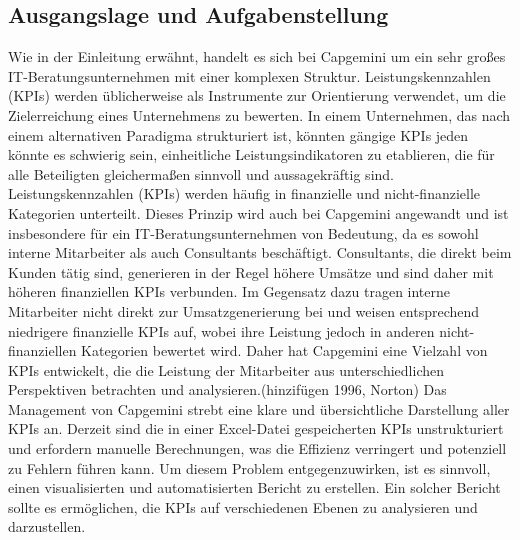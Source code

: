 \documentclass[a4paper, 12pt]{scrartcl}
\begin{document}
	\subsection{Ausgangslage und Aufgabenstellung}
Wie in der Einleitung erwähnt, handelt es sich bei Capgemini um ein sehr großes IT-Beratungsunternehmen mit einer komplexen Struktur. Leistungskennzahlen (KPIs) werden üblicherweise als Instrumente zur Orientierung verwendet, um die Zielerreichung eines Unternehmens zu bewerten. In einem Unternehmen, das nach einem alternativen Paradigma strukturiert ist, könnten gängige KPIs jeden könnte es schwierig sein, einheitliche Leistungsindikatoren zu etablieren, die für alle Beteiligten gleichermaßen sinnvoll und aussagekräftig sind\cite{aro2023using}.
\newline
Leistungskennzahlen (KPIs) werden häufig in finanzielle und nicht-finanzielle Kategorien unterteilt. Dieses Prinzip wird auch bei Capgemini angewandt und ist insbesondere für ein IT-Beratungsunternehmen von Bedeutung, da es sowohl interne Mitarbeiter als auch Consultants beschäftigt. Consultants, die direkt beim Kunden tätig sind, generieren in der Regel höhere Umsätze und sind daher mit höheren finanziellen KPIs verbunden. Im Gegensatz dazu tragen interne Mitarbeiter nicht direkt zur Umsatzgenerierung bei und weisen entsprechend niedrigere finanzielle KPIs auf, wobei ihre Leistung jedoch in anderen nicht-finanziellen Kategorien bewertet wird. Daher hat Capgemini eine Vielzahl von KPIs entwickelt, die die Leistung der Mitarbeiter aus unterschiedlichen Perspektiven betrachten und analysieren\cite{kald2000performance}.(hinzifügen 1996, Norton)
\newline
Das Management von Capgemini strebt eine klare und übersichtliche Darstellung aller KPIs an. Derzeit sind die in einer Excel-Datei gespeicherten KPIs unstrukturiert und erfordern manuelle Berechnungen, was die Effizienz verringert und potenziell zu Fehlern führen kann. Um diesem Problem entgegenzuwirken, ist es sinnvoll, einen visualisierten und automatisierten Bericht zu erstellen. Ein solcher Bericht sollte es ermöglichen, die KPIs auf verschiedenen Ebenen zu analysieren und darzustellen.
\end{document}
